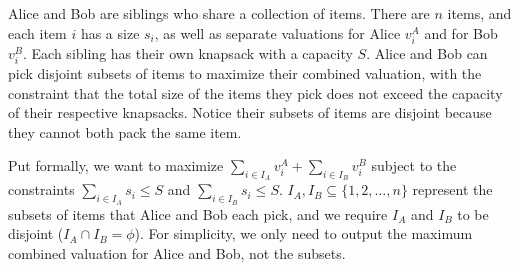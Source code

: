 \documentclass[11pt]{article}
\begin{document}
    \setlength{\headheight}{26pt}
    \pagestyle{fancy}
    \fancyfoot[C]{}
    \fancyfoot[R]{\thepage}
    \renewcommand{\headrulewidth}{0.4pt}
    \renewcommand{\footrulewidth}{0.4pt}
    

    \begin{tcolorbox}[title={Problem 1 (Knapsack, Take II, 50 pts)}] \setlength\parindent{1em}
    
     Alice and Bob are siblings who share a collection of items. There are \(n\) items, and each item \(i\) has a size \(s_i\), as well as separate valuations for Alice \(v_i^A\) and for Bob \(v_i^B\). Each sibling has their own knapsack with a capacity \(S\). Alice and Bob can pick disjoint subsets of items to maximize their combined valuation, with the constraint that the total size of the items they pick does not exceed the capacity of their respective knapsacks. Notice their subsets of items are disjoint because they cannot both pack the same item.

        \medskip
        
        Put formally, we want to maximize $\sum_{i\in I_A} v_i^A+\sum_{i\in I_B} v_i^B$ subject to the constraints $\sum_{i\in I_A} s_i\leq S$ and $\sum_{i\in I_B} s_i\leq S$. $I_A, I_B\subseteq\{1,2,\ldots, n\}$ represent the subsets of items that Alice and Bob each pick, and we require $I_A$ and $I_B$ to be disjoint ($I_A\cap I_B=\phi$). For simplicity, we only need to output the maximum combined valuation for Alice and Bob, not the subsets. 


\end{tcolorbox}
\end{document}
